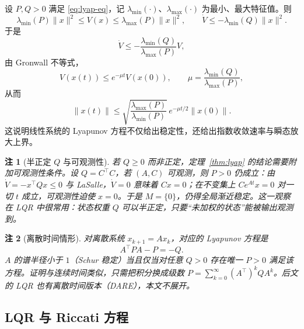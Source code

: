 \documentclass[11pt, a4paper, UTF8, fontset=none]{ctexart}
\theoremstyle{cnthm}
\newtheorem{remark}{注}[section]
\newcommand{\norm}[1]{\lVert #1\rVert}
\begin{document}
\begin{keybox}[定量估计]
设 $P,Q>0$ 满足 \eqref{eq:lyap-eq}，记 $\lambda_{\min}(\cdot)$、$\lambda_{\max}(\cdot)$ 为最小、最大特征值。则
\begin{equation}
  \lambda_{\min}(P)\norm{x}^2\le V(x)\le\lambda_{\max}(P)\norm{x}^2,
  \qquad
  \dot V\le-\lambda_{\min}(Q)\norm{x}^2.
\end{equation}
于是
\begin{equation}
  \dot V\le-\frac{\lambda_{\min}(Q)}{\lambda_{\max}(P)}V,
\end{equation}
由 Gronwall 不等式，
\begin{equation}
  V(x(t))\le e^{-\mu t}V(x(0)),\qquad
  \mu=\frac{\lambda_{\min}(Q)}{\lambda_{\max}(P)},
\end{equation}
从而
\begin{equation}
  \norm{x(t)}\le\sqrt{\frac{\lambda_{\max}(P)}{\lambda_{\min}(P)}}\,
  e^{-\mu t/2}\norm{x(0)}.
  \label{eq:exp-bound}
\end{equation}
这说明线性系统的 Lyapunov 方程不仅给出稳定性，还给出指数收敛速率与瞬态放大上界。
\end{keybox}

\begin{remark}[半正定 $Q$ 与可观测性]
若 $Q\ge0$ 而非正定，定理~\ref{thm:lyap} 的结论需要附加可观测性条件。设 $Q=C^\top C$，若 $(A,C)$ 可观测，则 $P>0$ 仍成立：由 $\dot V=-x^\top Qx\le0$ 与 LaSalle，$\dot V=0$ 意味着 $Cx=0$；在不变集上 $Ce^{At}x=0$ 对一切 $t$ 成立，可观测性迫使 $x=0$。于是 $M=\{0\}$，仍得全局渐近稳定。这一观察在 LQR 中很常用：状态权重 $Q$ 可以半正定，只要“未加权的状态”能被输出观测到。
\end{remark}

\begin{remark}[离散时间情形]
对离散系统 $x_{k+1}=Ax_k$，对应的 Lyapunov 方程是
\begin{equation}
  A^\top PA-P=-Q.
\end{equation}
$A$ 的谱半径小于 $1$（Schur 稳定）当且仅当对任意 $Q>0$ 存在唯一 $P>0$ 满足该方程。证明与连续时间类似，只需把积分换成级数 $P=\sum_{k=0}^\infty (A^\top)^kQA^k$。后文的 LQR 也有离散时间版本（DARE），本文不展开。
\end{remark}

\subsection{LQR 与 Riccati 方程}
\end{document}
